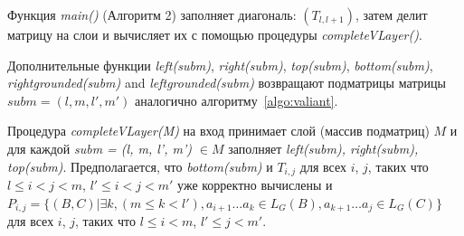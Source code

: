 \documentclass[14pt]{matmex-diploma-custom}
\begin{document}
Функция \textit{main()} (Алгоритм 2) заполняет диагональ:  $(T_{l, l+1})$, затем делит матрицу на слои и вычисляет их с помощью процедуры \textit{completeVLayer()}.

Дополнительные функции \textit{left(subm)}, \textit{right(subm)}, \textit{top(subm)}, \textit{bottom(subm)}, \textit{rightgrounded(subm)} and \textit{leftgrounded(subm)} возвращают подматрицы матрицы $\textit{subm} = (l, m, l', m')$ аналогично алгоритму~\ref{algo:valiant}.

Процедура \textit{completeVLayer(M)} на вход принимает слой (массив подматриц)  $M$ и для каждой \textit{subm = (l, m, l', m') $\in M$} заполняет \textit{left(subm), right(subm), top(subm)}.
Предполагается, что \textit{bottom(subm)} и $T_{i, j}$ для всех $i$, $j$, таких что $l \leq i < j < m$, $  l' \leq i < j < m'$ уже корректно вычислены и 
$P_{i, j} =  \{ (B, C) | \exists k, (m \le k < l'), a_{i + 1} \dots a_{k} \in L_G(B), a_{k + 1} \dots a_{j} \in L_G(C)\} $ для всех $i$, $j$, таких что $l \leq i < m$, $l' \leq j < m'$.
\end{document}
